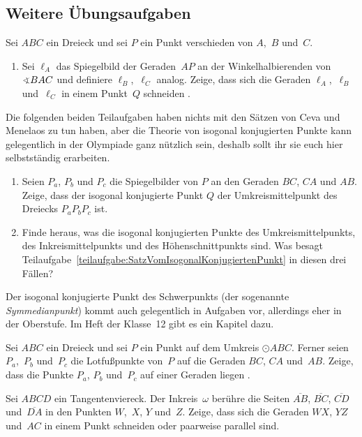 \subsection*{Weitere Übungsaufgaben}
\begin{aufgabe*}
	Sei $ABC$ ein Dreieck und sei $P$ ein Punkt verschieden von $A$,~$B$ und~$C$. 
	\begin{enumerate}
		\item Sei $\ell_A$ das Spiegelbild der Geraden~$AP$ an der Winkelhalbierenden von $\winkel BAC$ und definiere $\ell_B$,~$\ell_C$ analog. Zeige, dass sich die Geraden $\ell_A$,~$\ell_B$ und~$\ell_C$ in einem Punkt~$Q$ schneiden .
	\end{enumerate}
	Die folgenden beiden Teilaufgaben haben nichts mit den Sätzen von Ceva und Menelaos zu tun haben, aber die Theorie von isogonal konjugierten Punkte kann gelegentlich in der Olympiade ganz nützlich sein, deshalb sollt ihr sie euch hier selbstständig erarbeiten.
	\begin{enumerate}[resume]
		\item Seien $P_a$, $P_b$ und $P_c$ die Spiegelbilder von $P$ an den Geraden $BC$, $CA$ und $AB$. Zeige, dass der isogonal konjugierte Punkt $Q$ der Umkreismittelpunkt des Dreiecks $P_aP_bP_c$ ist.\label{teilaufgabe:SatzVomIsogonalKonjugiertenPunkt}
		\item Finde heraus, was die isogonal konjugierten Punkte des Umkreismittelpunkts, des Inkreismittelpunkts und des Höhenschnittpunkts sind. Was besagt Teilaufgabe~\ref{teilaufgabe:SatzVomIsogonalKonjugiertenPunkt} in diesen drei Fällen?
	\end{enumerate}
	Der isogonal konjugierte Punkt des Schwerpunkts (der sogenannte \emph{Symmedianpunkt}) kommt auch gelegentlich in Aufgaben vor, allerdings eher in der Oberstufe. Im Heft der Klasse~12 gibt es ein Kapitel dazu.
\end{aufgabe*}

\begin{aufgabe*}
	Sei $ABC$ ein Dreieck und sei $P$ ein Punkt auf dem Umkreis $\odot ABC$. Ferner seien $P_a$,~$P_b$ und~$P_c$ die Lotfußpunkte von~$P$ auf die Geraden $BC$, $CA$ und~$AB$. Zeige, dass die Punkte $P_a$, $P_b$ und~$P_c$ auf einer Geraden liegen .
\end{aufgabe*}

\begin{aufgabe*}
	Sei $ABCD$ ein Tangentenviereck. Der Inkreis~$\omega$ berühre die Seiten $\overline{AB}$, $\overline{BC}$, $\overline{CD}$ und~$\overline{DA}$ in den Punkten $W$,~$X$, $Y$ und~$Z$. Zeige, dass sich die Geraden $WX$, $YZ$ und~$AC$ in einem Punkt schneiden oder paarweise parallel sind.
\end{aufgabe*}

